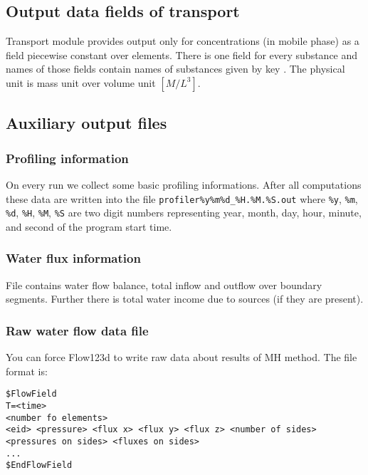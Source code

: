 \subsection{Output data fields of transport}
Transport module provides output only for concentrations (in mobile phase) as a field piecewise constant over elements. There is one field for every substance and names of those fields contain 
names of substances given by key . The physical unit is mass unit over volume unit $[M / L^3]$.





\subsection{Auxiliary output files}

\subsubsection{Profiling information}
On every run we collect some basic profiling informations. After all computations these data are written into the file
\verb'profiler%y%m%d_%H.%M.%S.out' where \verb'%y', \verb'%m', \verb'%d', \verb'%H', \verb'%M', \verb'%S' are 
two digit numbers representing year, month, day, hour, minute, and second of the program start time.

\subsubsection{Water flux information}
File contains water flow balance, total inflow and outflow over boundary segments. 
Further there is total water income due to sources (if they are present).


\subsubsection{Raw water flow data file}
You can force Flow123d to write raw data about results of MH method. The file format is:
\begin{verbatim}
$FlowField
T=<time>
<number fo elements>
<eid> <pressure> <flux x> <flux y> <flux z> <number of sides> <pressures on sides> <fluxes on sides> 
...
$EndFlowField
\end{verbatim}

